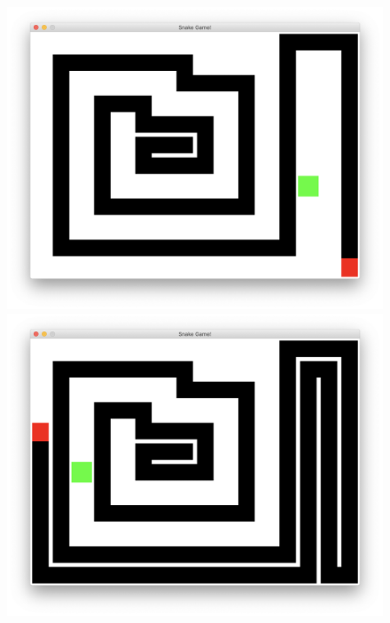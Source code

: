\documentclass[a4paper]{article}
\begin{document}
\begin{figure}[!hbt]
\begin{minipage}{0.19\textwidth}
    \includegraphics[width=\linewidth]{assets/lp3.png}
\end{minipage}
\begin{minipage}{0.19\textwidth}
    \centering
    \includegraphics[width=\linewidth]{assets/lp4.png}
\end{minipage}
\begin{minipage}{0.19\textwidth}
    \centering

\end{minipage}
\end{figure}
\end{document}

